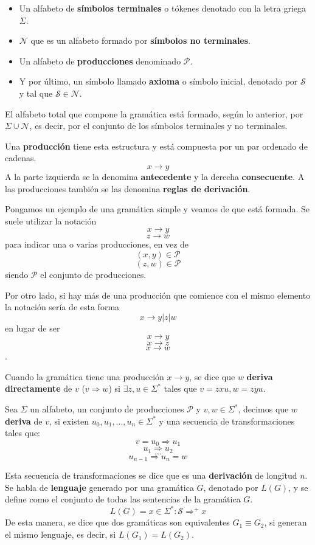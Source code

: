 \begin{itemize}
	\item Un alfabeto de \textbf{símbolos terminales} o tókenes denotado con la letra griega $\Sigma$.
	\item $\mathcal{N}$ que es un alfabeto formado por \textbf{símbolos no terminales}.
	\item Un alfabeto de \textbf{producciones} denominado $\mathcal{P}$.
	\item Y por último, un símbolo llamado \textbf{axioma} o símbolo inicial, denotado por $\mathcal{S}$ y tal que $\mathcal{S} \in \mathcal{N}$.
\end{itemize}

El alfabeto total que compone la gramática está formado, según lo anterior, por $\Sigma\cup\mathcal{N}$, es decir, por el conjunto de los símbolos terminales y no terminales.

Una \textbf{producción} tiene esta estructura y está compuesta por un par ordenado de cadenas. \[x \rightarrow y\] A la parte izquierda se la denomina \textbf{antecedente} y la derecha \textbf{consecuente}. A las producciones también se las denomina \textbf{reglas de derivación}.

Pongamos un ejemplo de una gramática simple y veamos de que está formada. Se suele utilizar la notación  \[x \rightarrow y\] \[z \rightarrow w\] para indicar una o varias producciones, en vez de \[(x, y) \in \mathcal{P} \] \[(z, w) \in \mathcal{P} \] siendo $\mathcal{P}$ el conjunto de producciones.

Por otro lado, si hay más de una producción que comience con el mismo elemento la notación sería de esta forma \[ x \rightarrow y | z | w\] en lugar de ser \[ x \rightarrow y\] \[x \rightarrow z\] \[x \rightarrow w\].

Cuando la gramática tiene una producción $x \rightarrow y$, se dice que $w$ \textbf{deriva directamente} de $v$ ($v \Rightarrow w$) si $\exists z, u \in \Sigma^{*}$ tales que $v=zxu, w=zyu$.

Sea $\Sigma$ un alfabeto, un conjunto de producciones $\mathcal{P}$ y $v, w \in \Sigma^{*}$, decimos que $w$ \textbf{deriva} de $v$, si existen $u_{0}, u_{1}, ..., u_{n} \in \Sigma^{*}$ y una secuencia de transformaciones tales que:
 \[ v = u_{0} \Rightarrow u_{1}\] \[ u_{1} \Rightarrow u_{2}\] \[...\] \[ u_{n-1} \Rightarrow u_{n} = w\]

Esta secuencia de transformaciones se dice que es una \textbf{derivación} de longitud $n$. Se habla de \textbf{lenguaje} generado por una gramática $G$, denotado por $L(G)$, y se define como el conjunto de todas las sentencias de la gramática $G$.  \[L(G) = x\in \Sigma^{*}:\mathcal{S} \Rightarrow^{+}x\]
De esta manera, se dice que dos gramáticas son equivalentes $G_{1} \equiv G_{2}$, si generan el mismo lenguaje, es decir, si $L(G_{1})=L(G_{2})$.

